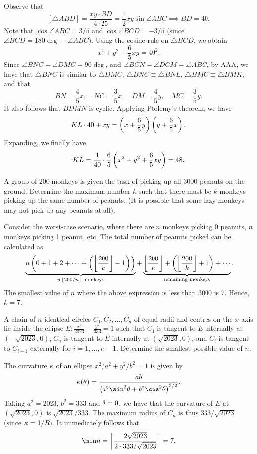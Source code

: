 Observe that \[[\triangle ABD] = \frac{xy \cdot BD}{4 \cdot 25} = \frac12 xy \sin \angle ABC \implies BD = 40.\] Note that $\cos \angle ABC = 3/5$ and $\cos \angle BCD = -3/5$ (since $\angle BCD = 180\deg - \angle ABC$). Using the cosine rule on $\triangle BCD$, we obtain \[x^2 + y^2 + \frac65 xy = 40^2.\] Since $\angle BNC = \angle DMC = 90 \deg$, and $\angle BCN = \angle DCM = \angle ABC$, by AAA, we have that $\triangle BNC$ is similar to $\triangle DMC$, $\triangle BNC \equiv \triangle BNL$, $\triangle BMC \equiv \triangle BMK$, and that \[BN = \frac45 x, \quad NC = \frac35 x, \quad DM = \frac45 y, \quad MC = \frac35 y.\] It also follows that $BDMN$ is cyclic. Applying Ptolemy's theorem, we have \[KL \cdot 40 + xy = \left( x + \frac65 y \right)\left( y + \frac65 x \right).\] Expanding, we finally have \[KL = \frac1{40} \cdot \frac65 \left( x^2 + y^2 + \frac65 xy \right) = 48.\]

\clearpage
\begin{question}[7]\label{A::2023-O-1-23}
    A group of 200 monkeys is given the task of picking up all 3000 peanuts on the ground. Determine the maximum number $k$ such that there must be $k$ monkeys picking up the same number of peanuts. (It is possible that some lazy monkeys may not pick up any peanuts at all).
\end{question}

Consider the worst-case scenario, where there are $n$ monkeys picking 0 peanuts, $n$ monkeys picking 1 peanut, etc. The total number of peanuts picked can be calculated as \[\ \underbrace{n\left( 0 + 1 + 2 + \cdots + \left( \left\lfloor \frac{200}{n} \right\rfloor - 1 \right) \right)}_{\text{$n\left\lfloor 200/n \right\rfloor$ monkeys}} + \underbrace{\left\lfloor \frac{200}{n} \right\rfloor + \left( \left\lfloor \frac{200}{k} \right\rfloor + 1 \right) + \cdots}_{\text{remaining monkeys}}.\] The smallest value of $n$ where the above expression is less than 3000 is $7$. Hence, $k = 7$.

\begin{question}[7]\label{A::2023-O-1-24}
    A chain of $n$ identical circles $C_1, C_2, \ldots, C_n$ of equal radii and centres on the $x$-axis lie inside the ellipse $E: \frac{x^2}{2023} + \frac{y^2}{333} = 1$ such that $C_1$ is tangent to $E$ internally at $(-\sqrt{2023}, 0)$, $C_n$ is tangent to $E$ internally at $(\sqrt{2023}, 0)$, and $C_i$ is tangent to $C_{i+1}$ externally for $i = 1, \ldots , n-1$. Determine the smallest possible value of $n$.
\end{question}

The curvature $\kappa$ of an ellipse $x^2/a^2 + y^2/b^2 = 1$ is given by \[\k(\t) = \frac{ab}{\bp{a^2\sin^2\t + b^2\cos^2\t}^{3/2}}.\] Taking $a^2 = 2023$, $b^2 = 333$ and $\theta = 0$, we have that the curvature of $E$ at $(\sqrt{2023}, 0)$ is $\sqrt{2023}/333$. The maximum radius of $C_n$ is thus $333/\sqrt{2023}$ (since $\kappa = 1/R$). It immediately follows that \[\min n = \ceil{\frac{2\sqrt{2023}}{2 \cdot 333/\sqrt{2023}}} = 7.\]
    
